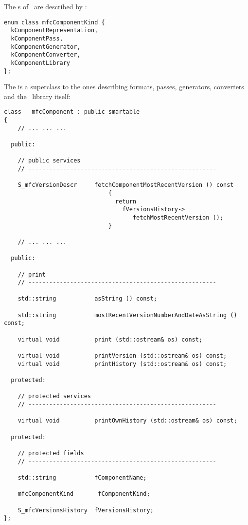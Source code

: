 The \component s of \mf\ are described by :
\begin{lstlisting}[language=CPlusPlus]
enum class mfcComponentKind {
  kComponentRepresentation,
  kComponentPass,
  kComponentGenerator,
  kComponentConverter,
  kComponentLibrary
};
\end{lstlisting}

The  is a superclass  to the ones describing formats, passes, generators, converters and the \mf\ library itself:
\begin{lstlisting}[language=CPlusPlus]
class   mfcComponent : public smartable
{
	// ... ... ...

  public:

    // public services
    // ------------------------------------------------------

    S_mfcVersionDescr     fetchComponentMostRecentVersion () const
                              {
                                return
                                  fVersionsHistory->
                                     fetchMostRecentVersion ();
                              }

	// ... ... ...

  public:

    // print
    // ------------------------------------------------------

    std::string           asString () const;

    std::string           mostRecentVersionNumberAndDateAsString () const;

    virtual void          print (std::ostream& os) const;

    virtual void          printVersion (std::ostream& os) const;
    virtual void          printHistory (std::ostream& os) const;

  protected:

    // protected services
    // ------------------------------------------------------

    virtual void          printOwnHistory (std::ostream& os) const;

  protected:

    // protected fields
    // ------------------------------------------------------

    std::string           fComponentName;

    mfcComponentKind       fComponentKind;

    S_mfcVersionsHistory  fVersionsHistory;
};
\end{lstlisting}

